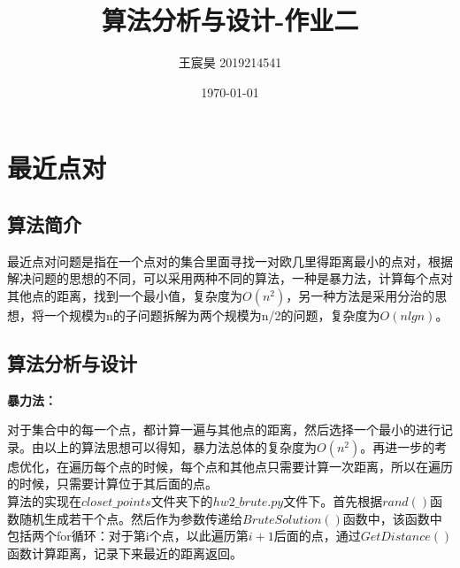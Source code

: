 \documentclass[UTF8]{ctexart}
\title{算法分析与设计-作业二}
\author{王宸昊 2019214541}
\date{\today}
\begin{document}
\maketitle


\section{最近点对}


\subsection{算法简介}

最近点对问题是指在一个点对的集合里面寻找一对欧几里得距离最小的点对，根据解决问题的思想的不同，可以采用两种不同的算法，一种是暴力法，计算每个点对其他点的距离，找到一个最小值，复杂度为$O(n^2)$，另一种方法是采用分治的思想，将一个规模为n的子问题拆解为两个规模为n/2的问题，复杂度为$O(nlgn)$。

\subsection{算法分析与设计}

\textbf{暴力法：}

对于集合中的每一个点，都计算一遍与其他点的距离，然后选择一个最小的进行记录。由以上的算法思想可以得知，暴力法总体的复杂度为$O(n^2)$。再进一步的考虑优化，在遍历每个点的时候，每个点和其他点只需要计算一次距离，所以在遍历的时候，只需要计算位于其后面的点。\\

算法的实现在$closet\_points$文件夹下的$hw2\_brute.py$文件下。首先根据$rand()$函数随机生成若干个点。然后作为参数传递给$BruteSolution()$函数中，该函数中包括两个for循环：对于第i个点，以此遍历第$i+1$后面的点，通过$GetDistance()$函数计算距离，记录下来最近的距离返回。\\
\end{document}
